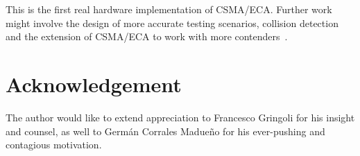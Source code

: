 \documentclass[conference]{IEEEtran}
\begin{document}
This is the first real hardware implementation of CSMA/ECA. Further work might involve the design of more accurate testing scenarios, collision detection and the extension of CSMA/ECA to work with more contenders~\cite{research2standards}.

\section{Acknowledgement}
The author would like to extend appreciation to Francesco Gringoli for his insight and counsel, as well to Germán Corrales Madueño for his ever-pushing and contagious motivation.



\end{document}
